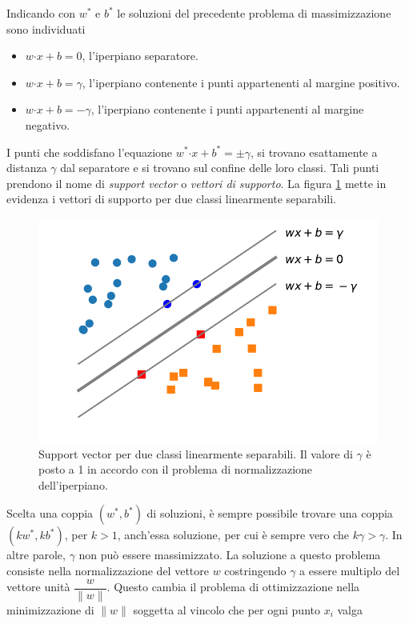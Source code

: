 \documentclass [11pt,a4paper,twoside,openright] {book}
\begin{document}
Indicando con $w^*$ e $b^*$ le soluzioni del precedente problema di massimizzazione sono individuati
\begin{itemize}
\item[]$w \boldsymbol{\cdot} x + b = 0$, l'iperpiano separatore.
\item[]$w \boldsymbol{\cdot} x + b = \gamma$, l'iperpiano contenente i punti appartenenti al margine positivo.
\item[]$w \boldsymbol{\cdot} x + b = -\gamma$, l'iperpiano contenente i punti appartenenti al margine negativo.
\end{itemize}
I punti che soddisfano l'equazione $w^* \boldsymbol{\cdot} x + b^* = \pm \gamma$, si trovano esattamente a distanza $\gamma$ dal separatore e si trovano sul confine delle loro classi. Tali punti prendono il nome di \textit{support vector} o \textit{vettori di supporto}. La figura \ref{supportvector} mette in evidenza i vettori di supporto per due classi linearmente separabili.
\begin{figure}[!h]
\centering
\includegraphics[scale=.6]{figure/supportvectors.pdf}
\caption{Support vector per due classi linearmente separabili. Il valore di $\gamma$ è posto a 1 in accordo con il problema di normalizzazione dell'iperpiano. \label{supportvector}}
\end{figure}Scelta una coppia $(w^*, b^*)$ di soluzioni, è sempre possibile trovare una coppia $(kw^*, kb^*)$, per $k>1$, anch'essa soluzione, per cui è sempre vero che $k\gamma > \gamma$. In altre parole, $\gamma$ non può essere massimizzato. La soluzione a questo problema consiste nella normalizzazione del vettore $w$ costringendo $\gamma$ a essere multiplo del vettore unità $\dfrac{w}{\parallel w \parallel}$. Questo cambia il problema di ottimizzazione nella minimizzazione di $\parallel w \parallel$ soggetta al vincolo che per ogni punto $x_i$ valga
\end{document}
